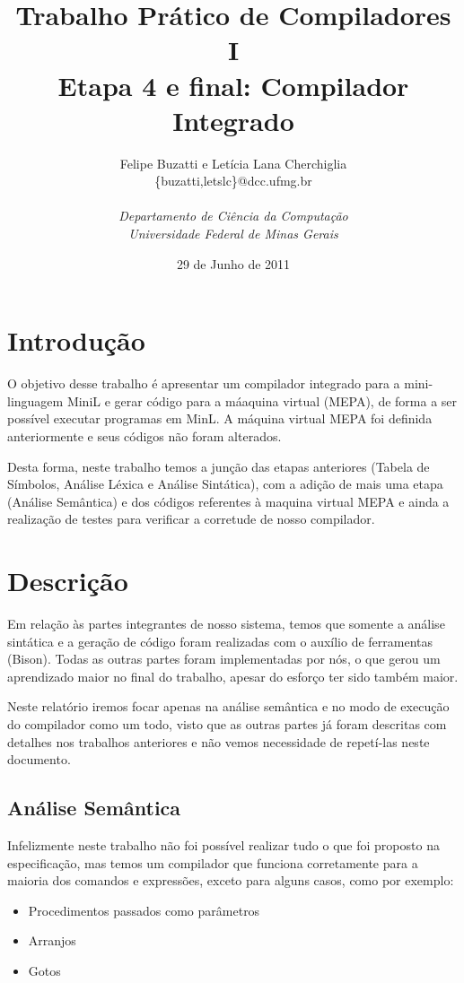 \documentclass[a4paper,12pt]{article}
\title{\textbf{Trabalho Prático de Compiladores I \\ Etapa 4 e final: Compilador Integrado}}
\author{
        Felipe Buzatti e Letícia Lana Cherchiglia \\
	\{buzatti,letslc\}@dcc.ufmg.br \\ \\
        \textit{Departamento de Ciência da Computação}\\
        \textit{Universidade Federal de Minas Gerais}\\
}
\date{29 de Junho de 2011}
\begin{document}
\maketitle

\section{Introdução}
\label{intro}

O objetivo desse trabalho é apresentar um compilador integrado para a mini-linguagem MiniL e gerar código para a máaquina virtual (MEPA), de forma a ser possível executar programas em MinL. A máquina virtual MEPA foi definida anteriormente e seus códigos não foram alterados.

Desta forma, neste trabalho temos a junção das etapas anteriores (Tabela de Símbolos, Análise Léxica e Análise Sintática), com a adição de mais uma etapa (Análise Semântica) e dos códigos referentes à maquina virtual MEPA e ainda a realização de testes para verificar a corretude de nosso compilador.

\section{Descrição}
Em relação às partes integrantes de nosso sistema, temos que somente a análise sintática e a geração de código foram realizadas com o auxílio de ferramentas (Bison). Todas as outras partes foram implementadas por nós, o que gerou um aprendizado maior no final do trabalho, apesar do esforço ter sido também maior. 

Neste relatório iremos focar apenas na análise semântica e no modo de execução do compilador como um todo, visto que as outras partes já foram descritas com detalhes nos trabalhos anteriores e não vemos necessidade de repetí-las neste documento.

\subsection{Análise Semântica}
Infelizmente neste trabalho não foi possível realizar tudo o que foi proposto na especificação, mas temos um compilador que funciona corretamente para a maioria dos comandos e expressões, exceto para alguns casos, como por exemplo:

\begin{itemize}
 \item Procedimentos passados como parâmetros
 \item Arranjos
 \item Gotos
\end{itemize}
\end{document}

